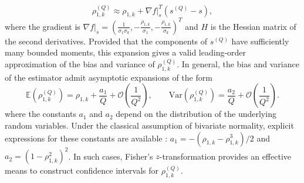 %
\begin{equation}
\label{eq:Correlated_Coeff_approx}
  \rho_{1,k}^{(Q)} \approx \rho_{1,k} + \nabla f |_{s}^T \left(s^{(Q)}-s\right), 
\end{equation}
%
where the gradient is $\nabla f|_{s} = (\frac{1}{\sigma_1\sigma_k},-\frac{\rho_{1,k}}{\sigma_1},-\frac{\rho_{1,k}}{\sigma_k} )^T$ and $H$ is the Hessian matrix of the second derivatives. Provided that the components of $s^{(Q)}$ have sufficiently many bounded moments, this expansion gives a valid leading-order approximation of the bias and variance of $\rho_{1,k}^{(Q)}$. In general, the bias and variance of the estimator admit asymptotic expansions of the form
%
\begin{equation*}
\label{eq:Expectation_var_rho}
    \mathbb{E}\left(\rho_{1,k}^{(Q)}\right) =\rho_{1,k}+\frac{a_1}{Q} + \mathcal{O}\left(\frac 1 {Q^2}\right),\qquad \text{Var}\left(\rho_{1,k}^{(Q)}\right)= \frac{a_2}{Q} + \mathcal{O}\left(\frac{1}{Q^2}\right).
\end{equation*}
%
where the constants $a_1$ and $a_2$ depend on the distribution of the underlying random variables. Under the classical assumption of bivariate normality, explicit expressions for these constants are available \cite{Fi:1915, Ha:2007, Ri:1932, So:1913}: $a_1 = -(\rho_{1,k} - \rho_{1,k}^3)/2$ and $a_2 = (1 - \rho_{1,k}^2)^2$. In such cases, Fisher's $z$-transformation \cite{Fi:1915} provides an effective means to construct confidence intervals for $\rho_{1,k}^{(Q)}$. 


